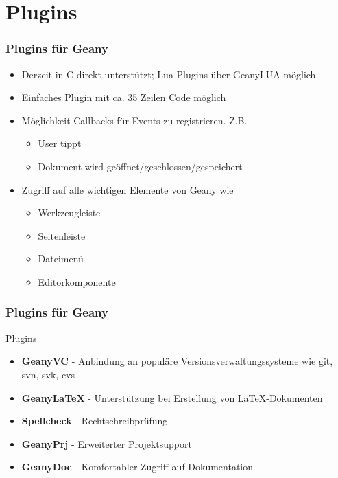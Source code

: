 \documentclass[compress]{beamer}
\begin{document}
\section{Plugins}
\begin{frame}
	\frametitle{Plugins für Geany}
	\begin{block}{}
		\begin{itemize}
			\item Derzeit in C direkt unterstützt; Lua Plugins über
				  GeanyLUA möglich
			\item Einfaches Plugin mit ca. 35 Zeilen Code möglich
			\item Möglichkeit Callbacks für Events zu registrieren. Z.B.
				\begin{itemize}
					\item User tippt
					\item Dokument wird geöffnet/geschlossen/gespeichert
				\end{itemize}
			\item Zugriff auf alle wichtigen Elemente von Geany wie
				\begin{itemize}
					\item Werkzeugleiste
					\item Seitenleiste
					\item Dateimenü
					\item Editorkomponente
				\end{itemize}
		\end{itemize}
	\end{block}
\end{frame}

\begin{frame}
	\frametitle{Plugins für Geany}
	\begin{block}{Plugins}
		\begin{itemize}
			\item \textbf{GeanyVC} - Anbindung an populäre
				Versions\-ver\-waltungs\-systeme wie git, svn, svk, cvs
			\item \textbf{GeanyLaTeX} - Unterstützung bei Erstellung von
				\LaTeX-Dokumenten
			\item \textbf{Spellcheck} - Rechtschreibprüfung
			\item \textbf{GeanyPrj} - Erweiterter Projektsupport
			\item \textbf{GeanyDoc} - Komfortabler Zugriff auf Dokumentation
		\end{itemize}
	\end{block}
\end{frame}
\end{document}
